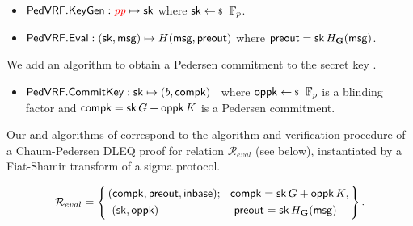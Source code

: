\begin{itemize}
	\item ${\mathsf{PedVRF}}.{\mathsf{KeyGen}}: {\color{red}\mathit{pp}} \mapsto \mathsf{sk}$  where $\sk \leftsample \F_p$. %
	\item ${\mathsf{PedVRF}}.{\mathsf{Eval}} : (\mathsf{sk},\mathsf{msg}) \mapsto H(\mathsf{msg}, {\mathsf{preout}})$ where ${\mathsf{preout}} = \mathsf{sk} \, H_{{\mathbf{G}}}(\mathsf{msg})$.
\end{itemize}
\noindent We add an algorithm to obtain a Pedersen commitment to the secret key \sk.
\begin{itemize}
	\item ${\mathsf{PedVRF}}.{\mathsf{CommitKey}}: \mathsf{sk} \mapsto (b, \mathsf{compk})$ \,
	where  $\openpk \leftsample \F_p$ is a blinding factor
	and $\mathsf{compk} = \mathsf{sk} \, G + \mathsf{oppk} \, K$ is a Pedersen commitment.
\end{itemize}

Our \Sign and \Verify algorithms of \PedVRF correspond to
the \Prove algorithm and verification procedure of a Chaum-Pedersen DLEQ proof
for relation $\mathcal{R}_{eval}$ (see below),
instantiated by a Fiat-Shamir transform of a sigma protocol.

$$ \mathcal{R}_{eval} = \Setst{
	\begin{aligned}
		& (\compk,\PreOut,\In) ; \\ 
		& \,\, (\sk, \openpk) 
	\end{aligned}
}{
	\begin{aligned}
		& \compk = \sk\,\genG + \openpk\,\genB, \\
		& \,\, \PreOut = \sk \, H_{\grE}(\msg) 
	\end{aligned}
}  \mathperiod \label{rel:commit} 
$$




